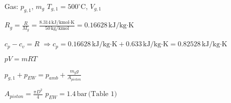 Gas: \( p_{g,1} \), \( m_g \)  
\( T_{g,1} = 500^\circ \text{C} \), \( V_{g,1} \)  

\( R_g = \frac{R}{M_g} = \frac{8.314 \, \text{kJ/kmol·K}}{50 \, \text{kg/kmol}} = 0.16628 \, \text{kJ/kg·K} \)  

\( c_p - c_v = R \)  
\( \Rightarrow c_p = 0.16628 \, \text{kJ/kg·K} + 0.633 \, \text{kJ/kg·K} = 0.82528 \, \text{kJ/kg·K} \)  

\( pV = mRT \)  

\( p_{g,1} + p_{EW} = p_{amb} + \frac{m_g g}{A_{piston}} \)  

\( A_{piston} = \frac{\pi D^2}{4} \)  
\( p_{EW} = 1.4 \, \text{bar} \, \text{(Table 1)} \)
